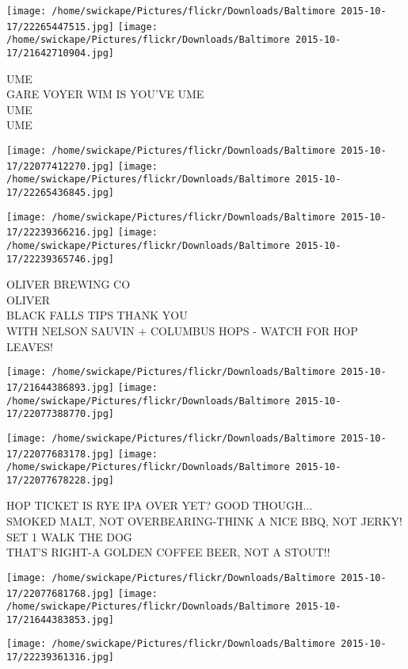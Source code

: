 \documentclass[10pt,letterpaper]{article}
\begin{document}
\texttt{[image: /home/swickape/Pictures/flickr/Downloads/Baltimore 2015-10-17/22265447515.jpg]}
\texttt{[image: /home/swickape/Pictures/flickr/Downloads/Baltimore 2015-10-17/21642710904.jpg]}

UME\\
GARE VOYER WIM IS YOU'VE UME\\
UME\\
UME
\pagebreak

\texttt{[image: /home/swickape/Pictures/flickr/Downloads/Baltimore 2015-10-17/22077412270.jpg]}
\texttt{[image: /home/swickape/Pictures/flickr/Downloads/Baltimore 2015-10-17/22265436845.jpg]}

\texttt{[image: /home/swickape/Pictures/flickr/Downloads/Baltimore 2015-10-17/22239366216.jpg]}
\texttt{[image: /home/swickape/Pictures/flickr/Downloads/Baltimore 2015-10-17/22239365746.jpg]}

OLIVER BREWING CO\\
OLIVER\\
BLACK FALLS TIPS THANK YOU\\
WITH NELSON SAUVIN + COLUMBUS HOPS {-} WATCH FOR HOP LEAVES!
\pagebreak

\texttt{[image: /home/swickape/Pictures/flickr/Downloads/Baltimore 2015-10-17/21644386893.jpg]}
\texttt{[image: /home/swickape/Pictures/flickr/Downloads/Baltimore 2015-10-17/22077388770.jpg]}

\texttt{[image: /home/swickape/Pictures/flickr/Downloads/Baltimore 2015-10-17/22077683178.jpg]}
\texttt{[image: /home/swickape/Pictures/flickr/Downloads/Baltimore 2015-10-17/22077678228.jpg]}

HOP TICKET IS RYE IPA OVER YET?  GOOD THOUGH...\\
SMOKED MALT, NOT OVERBEARING{-}THINK A NICE BBQ, NOT JERKY!\\
SET 1 WALK THE DOG\\
THAT'S RIGHT{-}A GOLDEN COFFEE BEER, NOT A STOUT!!
\pagebreak

\texttt{[image: /home/swickape/Pictures/flickr/Downloads/Baltimore 2015-10-17/22077681768.jpg]}
\texttt{[image: /home/swickape/Pictures/flickr/Downloads/Baltimore 2015-10-17/21644383853.jpg]}

\vspace{0.25in}
\texttt{[image: /home/swickape/Pictures/flickr/Downloads/Baltimore 2015-10-17/22239361316.jpg]}
\end{document}
